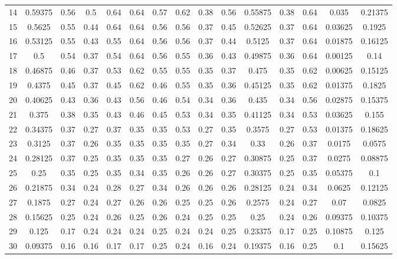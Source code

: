 \begin{appendices}
\begin{table}[!h]
{{\begin{tabular}{l||c|c|c|c|c|c|c|c|c||c|c|c||c|c}
 	 14 & 0.59375 & 0.56 & 0.5 & 0.64 & 0.64 & 0.57 & 0.62 & 0.38 & 0.56  &  0.55875 & 0.38 & 0.64  &  0.035 & 0.21375\\
 	 15 & 0.5625 & 0.55 & 0.44 & 0.64 & 0.64 & 0.56 & 0.56 & 0.37 & 0.45  &  0.52625 & 0.37 & 0.64  &  0.03625 & 0.1925\\
 	 16 & 0.53125 & 0.55 & 0.43 & 0.55 & 0.64 & 0.56 & 0.56 & 0.37 & 0.44  &  0.5125 & 0.37 & 0.64  &  0.01875 & 0.16125\\
 	 17 & 0.5 & 0.54 & 0.37 & 0.54 & 0.64 & 0.56 & 0.55 & 0.36 & 0.43  &  0.49875 & 0.36 & 0.64  &  0.00125 & 0.14\\
 	 18 & 0.46875 & 0.46 & 0.37 & 0.53 & 0.62 & 0.55 & 0.55 & 0.35 & 0.37  &  0.475 & 0.35 & 0.62  &  0.00625 & 0.15125\\
 	 19 & 0.4375 & 0.45 & 0.37 & 0.45 & 0.62 & 0.46 & 0.55 & 0.35 & 0.36  &  0.45125 & 0.35 & 0.62  &  0.01375 & 0.1825\\
 	 20 & 0.40625 & 0.43 & 0.36 & 0.43 & 0.56 & 0.46 & 0.54 & 0.34 & 0.36  &  0.435 & 0.34 & 0.56  &  0.02875 & 0.15375\\
 	 21 & 0.375 & 0.38 & 0.35 & 0.43 & 0.46 & 0.45 & 0.53 & 0.34 & 0.35  &  0.41125 & 0.34 & 0.53  &  0.03625 & 0.155\\
 	 22 & 0.34375 & 0.37 & 0.27 & 0.37 & 0.35 & 0.35 & 0.53 & 0.27 & 0.35  &  0.3575 & 0.27 & 0.53  &  0.01375 & 0.18625\\
 	 23 & 0.3125 & 0.37 & 0.26 & 0.35 & 0.35 & 0.35 & 0.35 & 0.27 & 0.34  &  0.33 & 0.26 & 0.37  &  0.0175 & 0.0575\\
 	 24 & 0.28125 & 0.37 & 0.25 & 0.35 & 0.35 & 0.35 & 0.27 & 0.26 & 0.27  &  0.30875 & 0.25 & 0.37  &  0.0275 & 0.08875\\
 	 25 & 0.25 & 0.35 & 0.25 & 0.35 & 0.34 & 0.35 & 0.26 & 0.26 & 0.27  &  0.30375 & 0.25 & 0.35  &  0.05375 & 0.1\\
 	 26 & 0.21875 & 0.34 & 0.24 & 0.28 & 0.27 & 0.34 & 0.26 & 0.26 & 0.26  &  0.28125 & 0.24 & 0.34  &  0.0625 & 0.12125\\
 	 27 & 0.1875 & 0.27 & 0.24 & 0.27 & 0.26 & 0.26 & 0.25 & 0.25 & 0.26  &  0.2575 & 0.24 & 0.27  &  0.07 & 0.0825\\
 	 28 & 0.15625 & 0.25 & 0.24 & 0.26 & 0.25 & 0.26 & 0.24 & 0.25 & 0.25  &  0.25 & 0.24 & 0.26  &  0.09375 & 0.10375\\
 	 29 & 0.125 & 0.17 & 0.24 & 0.24 & 0.24 & 0.25 & 0.24 & 0.24 & 0.25  &  0.23375 & 0.17 & 0.25  &  0.10875 & 0.125\\
 	 30 & 0.09375 & 0.16 & 0.16 & 0.17 & 0.17 & 0.25 & 0.24 & 0.16 & 0.24  &  0.19375 & 0.16 & 0.25  &  0.1 & 0.15625\\

\end{tabular}}}
\end{table}
\end{appendices}
